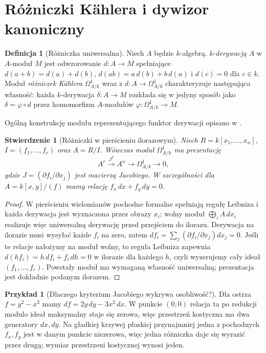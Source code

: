 \documentclass[11pt,a4paper,openany]{report}
\numberwithin{equation}{section}
\theoremstyle{plain}
\newtheorem{stwierdzenie}[twierdzenie]{Stwierdzenie}
\theoremstyle{definition}
\newtheorem{definicja}[twierdzenie]{Definicja}
\newtheorem{przyklad}[twierdzenie]{Przykład}
\theoremstyle{remark}
\begin{document}
\section{Różniczki Kählera i dywizor kanoniczny}
\label{sec:differentials}

\begin{definicja}[Różniczka uniwersalna]
Niech $A$ będzie $k$-algebrą. $k$-\emph{derywacją}
$A$ w $A$-moduł $M$ jest odwzorowanie
$d:A\to M$ spełniające $d(a+b)=d(a)+d(b)$,
$d(ab)=a\,d(b)+b\,d(a)$ i $d(c)=0$ dla $c\in k$.
Moduł \emph{różniczek Kählera} $\Omega^1_{A/k}$
wraz z $d:A\to\Omega^1_{A/k}$ charakteryzuje
następująca własność: każda $k$-derywacja
$\delta:A\to M$ rozkłada się w jedyny sposób
jako $\delta=\varphi\circ d$ przez homomorfizm
$A$-modułów $\varphi:\Omega^1_{A/k}\to M$.
\end{definicja}

Ogólną konstrukcję modułu reprezentującego funktor derywacji opisano w .

\begin{stwierdzenie}[Różniczki w pierścieniu ilorazowym]
\label{st:kahler}
Niech $R=k[x_1,\ldots,x_n]$, $I=(f_1,\ldots,f_r)$
oraz $A=R/I$. Wówczas moduł $\Omega^1_{A/k}$ ma prezentację
\[
 A^r\xrightarrow{J^T}A^n\longrightarrow
 \Omega^1_{A/k}\longrightarrow0,
\]
gdzie $J=(\partial f_i/\partial x_j)$ jest
macierzą Jacobiego. W szczególności dla
$A=k[x,y]/(f)$ mamy relację $f_x\,dx+f_y\,dy=0$.
\end{stwierdzenie}
\begin{proof}
W pierścieniu wielomianów pochodne formalne
spełniają regułę Leibniza i każda derywacja
jest wyznaczona przez obrazy $x_i$;
wolny moduł $\bigoplus_i A\,dx_i$ realizuje więc
uniwersalną derywację przed przejściem do ilorazu.
Derywacja na ilorazie musi wysyłać każde $f_i$
na zero, zatem $df_i=\sum_j(\partial f_i/\partial x_j)dx_j=0$.
Jeśli te relacje nałożymy na moduł wolny,
to reguła Leibniza zapewnia $d(hf_i)=h\,df_i+f_i\,dh=0$
w ilorazie dla każdego $h$, czyli wyzerujemy
cały ideał $(f_1,\ldots,f_r)$. Powstały moduł
ma wymaganą własność uniwersalną; prezentacja
jest dokładnie podanym ilorazem.
\end{proof}

\begin{przyklad}[Dlaczego kryterium Jacobiego wykrywa osobliwość?]
Dla ostrza $f=y^2-x^3$ mamy
$df=2y\,dy-3x^2\,dx$. W punkcie $(0,0)$
relacja ta po redukcji modulo ideał maksymalny
staje się zerowa, więc przestrzeń kostyczna
ma dwa generatory $dx,dy$. Na gładkiej krzywej
płaskiej przynajmniej jedna z pochodnych $f_x,f_y$
jest w danym punkcie niezerowa, więc jedna
różniczka daje się wyrazić przez drugą;
wymiar przestrzeni kostycznej wynosi jeden.
\end{przyklad}
\end{document}
